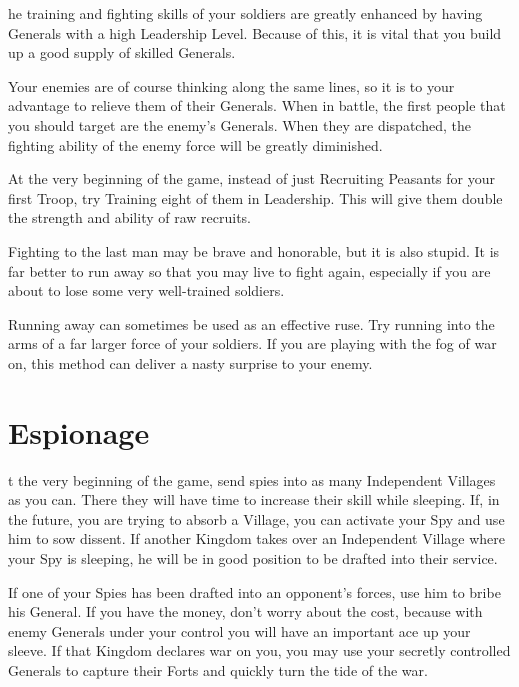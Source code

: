 
he training and fighting skills of your soldiers are greatly enhanced by having Generals with a high Leadership Level. Because of this, it is vital that you build up a good supply of skilled Generals.

Your enemies are of course thinking along the same lines, so it is to your advantage to relieve them of their Generals. When in battle, the first people that you should target are the enemy’s Generals. When they are dispatched, the fighting ability of the enemy force will be greatly diminished.

At the very beginning of the game, instead of just Recruiting Peasants for your first Troop, try Training eight of them in Leadership. This will give them double the strength and ability of raw recruits.

Fighting to the last man may be brave and honorable, but it is also stupid. It is far better to run away so that you may live to fight again, especially if you are about to lose some very well-trained soldiers.

Running away can sometimes be used as an effective ruse. Try running into the arms of a far larger force of your soldiers. If you are playing with the fog of war on, this method can deliver a nasty surprise to your enemy.

\section{Espionage}


t the very beginning of the game, send spies into as many Independent Villages as you can. There they will have time to increase their skill while sleeping. If, in the future, you are trying to absorb a Village, you can activate your Spy and use him to sow dissent. If another Kingdom takes over an Independent Village where your Spy is sleeping, he will be in good position to be drafted into their service.

If one of your Spies has been drafted into an opponent’s forces, use him to bribe his General. If you have the money, don’t worry about the cost, because with enemy Generals under your control you will have an important ace up your sleeve. If that Kingdom declares war on you, you may use your secretly controlled Generals to capture their Forts and quickly turn the tide of the war.

